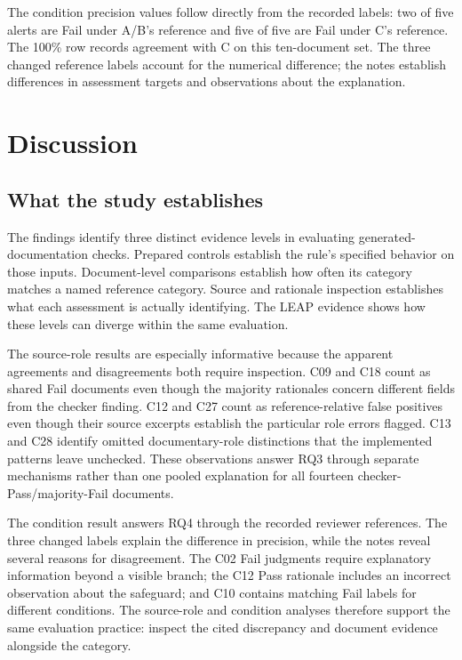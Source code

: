 \documentclass[a4paper,fleqn]{cas-dc}
\begin{document}
The condition precision values follow directly from the recorded labels: two of five alerts are Fail under A/B's reference and five of five are Fail under C's reference. The 100\% row records agreement with C on this ten-document set. The three changed reference labels account for the numerical difference; the notes establish differences in assessment targets and observations about the explanation.

\section{Discussion}
\subsection{What the study establishes}
The findings identify three distinct evidence levels in evaluating generated-documentation checks. Prepared controls establish the rule's specified behavior on those inputs. Document-level comparisons establish how often its category matches a named reference category. Source and rationale inspection establishes what each assessment is actually identifying. The LEAP evidence shows how these levels can diverge within the same evaluation.

The source-role results are especially informative because the apparent agreements and disagreements both require inspection. C09 and C18 count as shared Fail documents even though the majority rationales concern different fields from the checker finding. C12 and C27 count as reference-relative false positives even though their source excerpts establish the particular role errors flagged. C13 and C28 identify omitted documentary-role distinctions that the implemented patterns leave unchecked. These observations answer RQ3 through separate mechanisms rather than one pooled explanation for all fourteen checker-Pass/majority-Fail documents.

The condition result answers RQ4 through the recorded reviewer references. The three changed labels explain the difference in precision, while the notes reveal several reasons for disagreement. The C02 Fail judgments require explanatory information beyond a visible branch; the C12 Pass rationale includes an incorrect observation about the safeguard; and C10 contains matching Fail labels for different conditions. The source-role and condition analyses therefore support the same evaluation practice: inspect the cited discrepancy and document evidence alongside the category.
\end{document}
